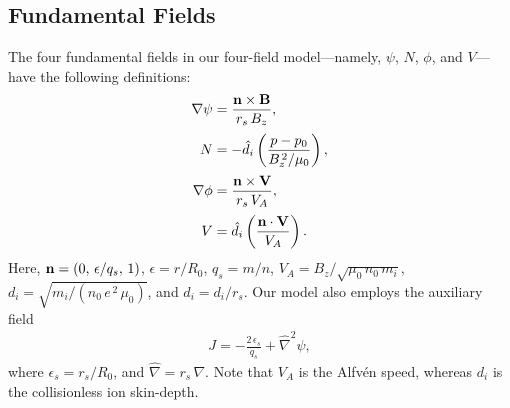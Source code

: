 \documentclass[12pt,prb,aps]{revtex4-1}
\begin{document}
\subsection{Fundamental Fields}
The four fundamental fields in our four-field model---namely, $\psi$, $N$, $\phi$, and $V$---have the following
definitions:
\begin{align}\label{e10}
\nabla\psi &= \frac{{\bf n}\times{\bf B}} {r_s\,B_z},\\[0.5ex]
N &=-\hat{d}_i\left(\frac{p-p_0}{B_z^{\,2}/\mu_0}\right),\\[0.5ex]
\nabla\phi &= \frac{{\bf n}\times {\bf V}}{r_s\,V_A},\\[0.5ex]
V &= \hat{d}_i\left(\frac{{\bf n}\cdot {\bf V}}{V_A}\right).\label{e13}
\end{align}
Here,   ${\bf n} = (0,\,\epsilon/q_s,\,1)$, $\epsilon = r/R_0$, $q_s=m/n$, 
$V_A =B_z/\sqrt{\mu_0\,n_0\,m_i}$, 
$d_i = \sqrt{m_i/(n_0\,e^{\,2}\,\mu_0)}$,
and $\hat{d}_i=d_i/r_s$. 
 Our
model also employs the auxiliary field
\begin{align}\label{e16}
J=-\frac{2\,\epsilon_s}{q_s}+\hat{\nabla}^2\psi,
\end{align}
where 
$\epsilon_s=r_s/R_0$, and $\hat{\nabla} = r_s\,\nabla$. Note that $V_A$ is the Alfv\'{e}n speed, whereas $d_i$ is the collisionless ion skin-depth. 
\end{document}
